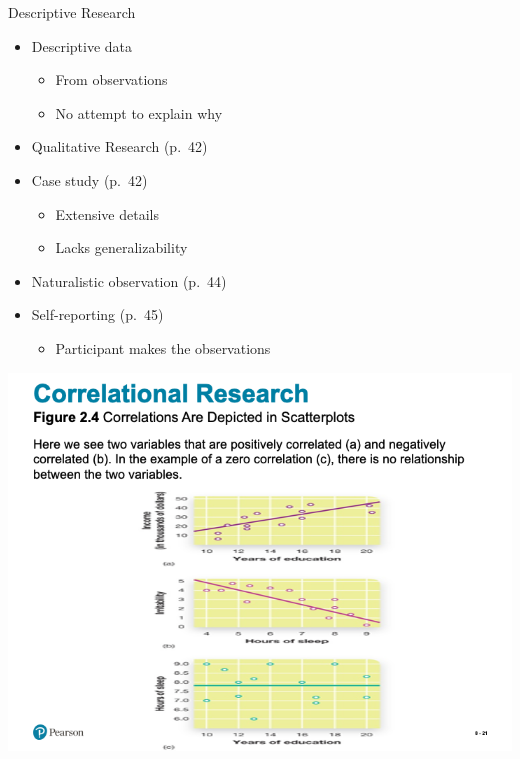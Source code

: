 \documentclass[
]{book}
\providecommand{\tightlist}{%
  \setlength{\itemsep}{0pt}\setlength{\parskip}{0pt}}
\begin{document}
\begin{reflect}
Descriptive Research

\begin{itemize}
\tightlist
\item
  Descriptive data

  \begin{itemize}
  \tightlist
  \item
    From observations\\
  \item
    No attempt to explain why\\
  \end{itemize}
\item
  Qualitative Research (p.~42)\\
\item
  Case study (p.~42)

  \begin{itemize}
  \tightlist
  \item
    Extensive details\\
  \item
    Lacks generalizability\\
  \end{itemize}
\item
  Naturalistic observation (p.~44)\\
\item
  Self-reporting (p.~45)

  \begin{itemize}
  \tightlist
  \item
    Participant makes the observations
  \end{itemize}
\end{itemize}

\includegraphics{assets/unit_1/slide_21.png}


\end{reflect}
\end{document}
